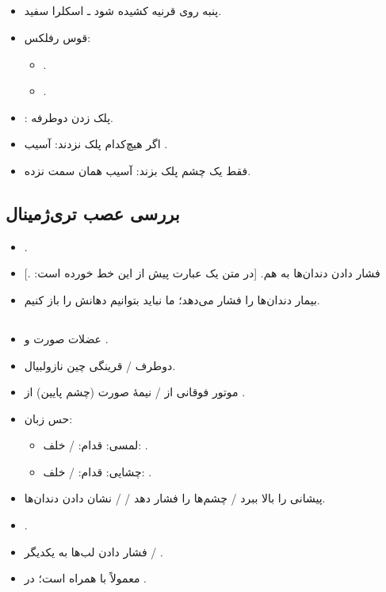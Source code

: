 \documentclass[a4paper,12pt]{extbook}
\begin{document}
\subsection*{}
\begin{itemize}
\item پنبه روی قرنیه کشیده شود ـ اسکلرا سفید.
\item قوس رفلکس:
  \begin{itemize}
  \item {}.
  \item {}.
  \end{itemize}
\item {}: پلک زدن دوطرفه.
\item اگر هیچ‌کدام پلک نزدند: آسیب .
\item فقط یک چشم پلک بزند: آسیب  همان سمت نزده.
\end{itemize}
\subsection*{بررسی  عصب تری‌ژمینال}
\begin{itemize}
\item {}.
\item فشار دادن دندان‌ها به هم. [در متن یک عبارت پیش از این خط خورده است: .]
\item بیمار دندان‌ها را فشار می‌دهد؛ ما نباید بتوانیم دهانش را باز کنیم.
\end{itemize}
\subsection*{}
\begin{itemize}
\item عضلات صورت و .
\item {} دوطرف / قرینگی چین نازولبیال.
\item موتور فوقانی از  / نیمهٔ صورت (چشم پایین) از .
\item حس زبان:
  \begin{itemize}
  \item لمسی: قدام:  / خلف: .
  \item چشایی: قدام:  / خلف: .
  \end{itemize}
\item پیشانی را بالا ببرد / چشم‌ها را فشار دهد /  / نشان دادن دندان‌ها.
\item {}.
\item فشار دادن لب‌ها به یکدیگر / .
\item {} معمولاً با  همراه است؛ در .
\end{itemize}
\end{document}

